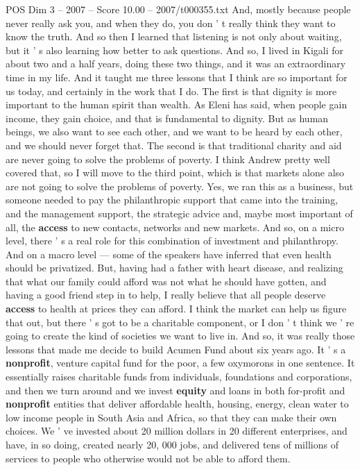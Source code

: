 \begin{textsample}{POS Dim 3 – 2007 – Score 10.00 – 2007/t000355.txt}
And, mostly because people never really ask you, and when they do, you don ' t really think they want to know the truth.
And so then I learned that listening is not only about waiting, but it ' s also learning how better to ask questions.
And so, I lived in Kigali for about two and a half years, doing these two things, and it was an extraordinary time in my life.
And it taught me three lessons that I think are so important for us today, and certainly in the work that I do.
The first is that dignity is more important to the human spirit than wealth.
As Eleni has said, when people gain income, they gain choice, and that is fundamental to dignity.
But as human beings, we also want to see each other, and we want to be heard by each other, and we should never forget that.
The second is that traditional charity and aid are never going to solve the problems of poverty.
I think Andrew pretty well covered that, so I will move to the third point, which is that markets alone also are not going to solve the problems of poverty.
Yes, we ran this as a business, but someone needed to pay the philanthropic support that came into the training, and the management support, the strategic advice and, maybe most important of all, the \textbf{access} to new contacts, networks and new markets.
And so, on a micro level, there ' s a real role for this combination of investment and philanthropy.
And on a macro level — some of the speakers have inferred that even health should be privatized.
But, having had a father with heart disease, and realizing that what our family could afford was not what he should have gotten, and having a good friend step in to help, I really believe that all people deserve \textbf{access} to health at prices they can afford.
I think the market can help us figure that out, but there ' s got to be a charitable component, or I don ' t think we ' re going to create the kind of societies we want to live in.
And so, it was really those lessons that made me decide to build Acumen Fund about six years ago.
It ' s a \textbf{nonprofit}, venture capital fund for the poor, a few oxymorons in one sentence.
It essentially raises charitable funds from individuals, foundations and corporations, and then we turn around and we invest \textbf{equity} and loans in both for-profit and \textbf{nonprofit} entities that deliver affordable health, housing, energy, clean water to low income people in South Asia and Africa, so that they can make their own choices.
We ' ve invested about 20 million dollars in 20 different enterprises, and have, in so doing, created nearly 20, 000 jobs, and delivered tens of millions of services to people who otherwise would not be able to afford them.

\end{textsample}
